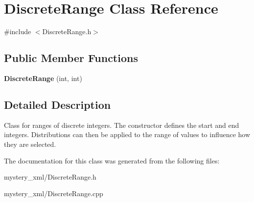 \hypertarget{classDiscreteRange}{
\section{DiscreteRange Class Reference}
\label{classDiscreteRange}
}


{\ttfamily \#include $<$DiscreteRange.h$>$}\subsection*{Public Member Functions}
\begin{DoxyCompactItemize}
\item 
\hypertarget{classDiscreteRange_a8191ac666aae46834fce7aa09f11fb11}{
{\bfseries DiscreteRange} (int, int)}
\label{classDiscreteRange_a8191ac666aae46834fce7aa09f11fb11}

\end{DoxyCompactItemize}


\subsection{Detailed Description}
Class for ranges of discrete integers. The constructor defines the start and end integers. Distributions can then be applied to the range of values to influence how they are selected. 

The documentation for this class was generated from the following files:\begin{DoxyCompactItemize}
\item 
mystery\_\-xml/DiscreteRange.h\item 
mystery\_\-xml/DiscreteRange.cpp\end{DoxyCompactItemize}
